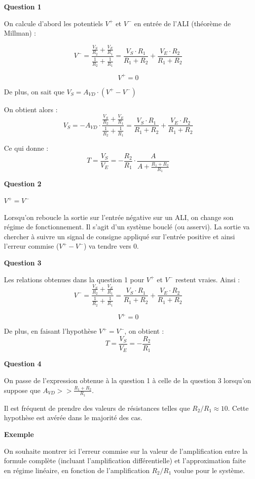\documentclass[a4paper,french]{paper}
\begin{document}
\textbf{Question 1}

On calcule d'abord les potentiels $V^+$ et $V^-$ en entrée de l'ALI (théorème de Millman) :

$$V^- = \frac{\frac{V_S}{R_2} + \frac{V_E}{R_1}}{\frac{1}{R_2} + \frac{1}{R_1}} = \frac{V_S \cdot R_1}{R_1 + R_2} + \frac{V_E \cdot R_2}{R_1 + R_2}$$

$$V^+ = 0$$

De plus, on sait que $V_S = A_{VD} \cdot (V^+ - V^-)$

On obtient alors : $$V_S = - A_{VD} \cdot \frac{\frac{V_S}{R_2} + \frac{V_E}{R_1}}{\frac{1}{R_2} + \frac{1}{R_1}} = \frac{V_S \cdot R_1}{R_1 + R_2} + \frac{V_E \cdot R_2}{R_1 + R_2}$$

Ce qui donne : $$T = \frac{V_S}{V_E} = - \frac{R_2}{R_1} \cdot \frac{A}{A + \frac{R_1 + R_2}{R_1}}$$


\textbf{Question 2}

$V^+ = V^-$

Lorsqu'on reboucle la sortie sur l'entrée négative sur un ALI, on change son régime de fonctionnement. Il s'agit d'un système bouclé (ou asservi). La sortie va chercher à suivre un signal de consigne appliqué sur l'entrée positive et ainsi l'erreur commise ($V^+ - V^-$) va tendre vers 0.


\textbf{Question 3}

Les relations obtenues dans la question 1 pour $V^+$ et $V^-$ restent vraies. Ainsi : 
$$V^- = \frac{\frac{V_S}{R_2} + \frac{V_E}{R_1}}{\frac{1}{R_2} + \frac{1}{R_1}} = \frac{V_S \cdot R_1}{R_1 + R_2} + \frac{V_E \cdot R_2}{R_1 + R_2}$$

$$V^+ = 0$$

De plus, en faisant l'hypothèse $V^+ = V^-$, on obtient : $$T = \frac{V_S}{V_E} = - \frac{R_2}{R_1}$$

\textbf{Question 4}

On passe de l'expression obtenue à la question 1 à celle de la question 3 lorsqu'on suppose que $A_{VD} >> \frac{R_1 + R_2}{R_1}$.

Il est fréquent de prendre des valeurs de résistances telles que $R_2 / R_1 \approx 10$. Cette hypothèse est avérée dans le majorité des cas.


\textbf{Exemple}

On souhaite montrer ici l'erreur commise sur la valeur de l'amplification entre la formule complète (incluant l'amplification différentielle) et l'approximation faite en régime linéaire, en fonction de l'amplification $R_2 / R_1$ voulue pour le système.
\end{document}
